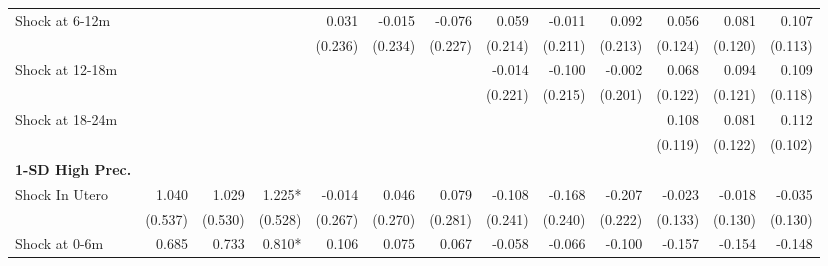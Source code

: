 \begin{tabular}{lrrrrrrrrrrrr}
Shock at 6-12m                              &              &              &              &        0.031 &       -0.015 &       -0.076 &        0.059 &       -0.011 &         0.092 &        0.056 &        0.081 &         0.107 \\ 
                                            &              &              &              &      (0.236) &      (0.234) &      (0.227) &      (0.214) &      (0.211) &       (0.213) &      (0.124) &      (0.120) &       (0.113) \\ 
Shock at 12-18m                             &              &              &              &              &              &              &       -0.014 &       -0.100 &        -0.002 &        0.068 &        0.094 &         0.109 \\ 
                                            &              &              &              &              &              &              &      (0.221) &      (0.215) &       (0.201) &      (0.122) &      (0.121) &       (0.118) \\ 
Shock at 18-24m                             &              &              &              &              &              &              &              &              &               &        0.108 &        0.081 &         0.112 \\ 
                                            &              &              &              &              &              &              &              &              &               &      (0.119) &      (0.122) &       (0.102) \\ 
\textbf{1-SD High Prec.}     &              &              &              &              &              &              &              &              &               &              &              &               \\ 
Shock In Utero                              &        1.040 &        1.029 &       1.225* &       -0.014 &        0.046 &        0.079 &       -0.108 &       -0.168 &        -0.207 &       -0.023 &       -0.018 &        -0.035 \\ 
                                            &      (0.537) &      (0.530) &      (0.528) &      (0.267) &      (0.270) &      (0.281) &      (0.241) &      (0.240) &       (0.222) &      (0.133) &      (0.130) &       (0.130) \\ 
Shock at 0-6m                               &        0.685 &        0.733 &       0.810* &        0.106 &        0.075 &        0.067 &       -0.058 &       -0.066 &        -0.100 &       -0.157 &       -0.154 &        -0.148 \\ 

\end{tabular}
